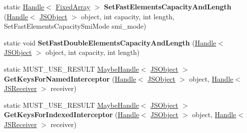 \begin{DoxyCompactItemize}
\item 
\hypertarget{classv8_1_1internal_1_1_j_s_object_a401f33a92d0871c91360b3eab28209c2}{}static \hyperlink{classv8_1_1internal_1_1_handle}{Handle}$<$ \hyperlink{classv8_1_1internal_1_1_fixed_array}{Fixed\+Array} $>$ {\bfseries Set\+Fast\+Elements\+Capacity\+And\+Length} (\hyperlink{classv8_1_1internal_1_1_handle}{Handle}$<$ \hyperlink{classv8_1_1internal_1_1_j_s_object}{J\+S\+Object} $>$ object, int capacity, int length, Set\+Fast\+Elements\+Capacity\+Smi\+Mode smi\+\_\+mode)\label{classv8_1_1internal_1_1_j_s_object_a401f33a92d0871c91360b3eab28209c2}

\item 
\hypertarget{classv8_1_1internal_1_1_j_s_object_a44c0679a1248498bec7de240dcbe045e}{}static void {\bfseries Set\+Fast\+Double\+Elements\+Capacity\+And\+Length} (\hyperlink{classv8_1_1internal_1_1_handle}{Handle}$<$ \hyperlink{classv8_1_1internal_1_1_j_s_object}{J\+S\+Object} $>$ object, int capacity, int length)\label{classv8_1_1internal_1_1_j_s_object_a44c0679a1248498bec7de240dcbe045e}

\item 
\hypertarget{classv8_1_1internal_1_1_j_s_object_ad7bede1b8ae91f06bd06f084e0a33ce2}{}static M\+U\+S\+T\+\_\+\+U\+S\+E\+\_\+\+R\+E\+S\+U\+L\+T \hyperlink{classv8_1_1internal_1_1_maybe_handle}{Maybe\+Handle}$<$ \hyperlink{classv8_1_1internal_1_1_j_s_object}{J\+S\+Object} $>$ {\bfseries Get\+Keys\+For\+Named\+Interceptor} (\hyperlink{classv8_1_1internal_1_1_handle}{Handle}$<$ \hyperlink{classv8_1_1internal_1_1_j_s_object}{J\+S\+Object} $>$ object, \hyperlink{classv8_1_1internal_1_1_handle}{Handle}$<$ \hyperlink{classv8_1_1internal_1_1_j_s_receiver}{J\+S\+Receiver} $>$ receiver)\label{classv8_1_1internal_1_1_j_s_object_ad7bede1b8ae91f06bd06f084e0a33ce2}

\item 
\hypertarget{classv8_1_1internal_1_1_j_s_object_a8c6e9f9c1488088b506938e7c12ac724}{}static M\+U\+S\+T\+\_\+\+U\+S\+E\+\_\+\+R\+E\+S\+U\+L\+T \hyperlink{classv8_1_1internal_1_1_maybe_handle}{Maybe\+Handle}$<$ \hyperlink{classv8_1_1internal_1_1_j_s_object}{J\+S\+Object} $>$ {\bfseries Get\+Keys\+For\+Indexed\+Interceptor} (\hyperlink{classv8_1_1internal_1_1_handle}{Handle}$<$ \hyperlink{classv8_1_1internal_1_1_j_s_object}{J\+S\+Object} $>$ object, \hyperlink{classv8_1_1internal_1_1_handle}{Handle}$<$ \hyperlink{classv8_1_1internal_1_1_j_s_receiver}{J\+S\+Receiver} $>$ receiver)\label{classv8_1_1internal_1_1_j_s_object_a8c6e9f9c1488088b506938e7c12ac724}


\end{DoxyCompactItemize}
